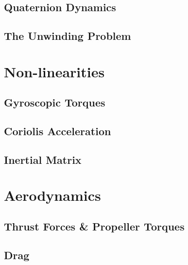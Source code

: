 \subsection{Quaternion Dynamics}
\label{subsec:dynamics.rigidbody.quaternion}
\subsection{The Unwinding Problem}
\label{subsec:dynamics.rigidbody.unwinding}

\section{Non-linearities}
\label{sec:dynamics.nonlinearities}
\subsection{Gyroscopic Torques}
\label{subsec:dynamics.nonlinearities.gyrotorques}
\subsection{Coriolis Acceleration}
\label{subsec:dynamics.nonlinearities.coriolis}
\subsection{Inertial Matrix}
\label{subsec:dynamics.nonlinearities.inertia}

\section{Aerodynamics}
\label{sec:dynamics.aero}
\subsection{Thrust Forces \& Propeller Torques}
\label{subsec:dynamics.aero.bem}
\subsection{Drag}
\label{subsec:dynamics.aero.drag}
